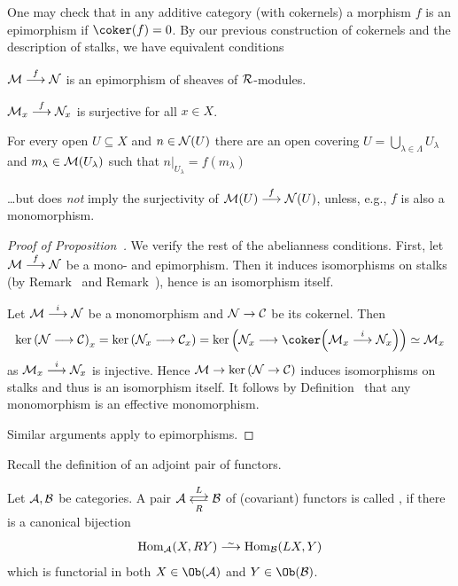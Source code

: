 \documentclass[a4paper,parskip=half,numbers=enddot, DIV=12]{scrreprt}
\begin{document}
\begin{rem}
	One may check that in any additive category (with cokernels) a morphism $f$ is an epimorphism if $\coker(f)=0$. By our previous construction of cokernels and the description of stalks, we have equivalent conditions
	\begin{alphanumerate}
		\item $\Mm\morphism[f]\Nn$ is an epimorphism of sheaves of $\mathcal{R}$-modules.
		\item $\Mm_x\morphism[f]\Nn_x$ is surjective for all $x\in X$.
		\item For every open $U\subseteq X$ and $n\in\mathcal{N}(U)$ there are an open covering $U=\bigcup_{\lambda\in\Lambda}U_\lambda$ and $m_\lambda\in\mathcal{M}(U_\lambda)$ such that $n|_{U_\lambda}=f(m_\lambda)$
	\end{alphanumerate}
	\ldots but  does \emph{not} imply the surjectivity of $\Mm(U)\morphism[f]\Nn(U)$, unless, e.g., $f$ is also a monomorphism.
\end{rem}
\begin{proof}[Proof of Proposition~]
	We verify the rest of the abelianness conditions. First, let $\Mm\morphism[f]\Nn$ be a mono- and epimorphism. Then it induces isomorphisms on stalks (by Remark~ and Remark~), hence is an isomorphism itself.
	
	Let $\Mm\morphism[i]\Nn$ be a monomorphism and $\Nn\morphism\Cc$ be its cokernel. Then 
	\begin{align*}
		\ker\left(\Nn\morphism\Cc\right)_x=\ker\left(\Nn_x\morphism\Cc_x\right)=\ker\left(\Nn_x\morphism\coker\Big(\Mm_x\morphism[i]\Nn_x\Big)\right)\simeq\Mm_x
	\end{align*}
	as $\Mm_x\morphism[i]\Nn_x$ is injective. Hence $\Mm\morphism\ker\left(\Nn\morphism\Cc\right)$ induces isomorphisms on stalks and thus is an isomorphism itself. It follows by Definition~ that any monomorphism is an effective monomorphism.
	
	Similar arguments apply to epimorphisms.	
\end{proof}
Recall the definition of an adjoint pair of functors.
\begin{defi}
	Let $\mathcal{A},\mathcal{B}$ be categories. A pair $\Aa\doublelrmorphism[L][R]\Bb$ of (covariant) functors is called , if there is a canonical bijection
	\begin{align*}
		\Hom_\Aa(X,RY)\isomorphism\Hom_\Bb(LX,Y)
	\end{align*}
	which is functorial in both $X\in\Ob(\Aa)$ and $Y\in\Ob(\Bb)$.
\end{defi}
\end{document}
